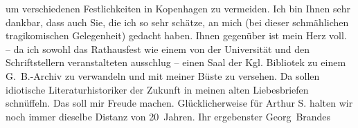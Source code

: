 \begin{ledgroupsized}[t]{13cm}
               um verschiedenen Festlichkeiten in Kopenhagen
               zu vermeiden. Ich bin Ihnen sehr dankbar, dass auch Sie, die ich so sehr schätze, an
               mich (bei dieser schmählichen tragikomischen Gelegenheit) gedacht haben.\pend
           \pstart
           Ihnen gegenüber ist mein Herz voll. \label{K_L02051-1v}\label{K_L02051-1h} – da ich sowohl das Rathausfest wie einem von
               der Universität und den Schriftstellern veranstalteten ausschlug – einen Saal der Kgl. Bibliotek zu einem G. B.-Archiv zu verwandeln und mit meiner Büste zu versehen.\pend
           \pstart
           Da sollen idiotische Literaturhistoriker der Zukunft in meinen alten Liebesbriefen
               schnüffeln. Das soll mir Freude machen.\pend
           \pstart
           Glücklicherweise für Arthur S. halten wir noch immer dieselbe Distanz von
               20 Jahren.\pend
           \pstart Ihr ergebenster \spacefill\mbox{Georg Brandes}\pend{}
         
         \endnumbering{}\end{ledgroupsized}  \newcommand{\dateiname}{L02051}\newcommand{\titel}{Georg Brandes an Arthur und Olga Schnitzler, 3. 2. 1912}\newcommand{\editorInnen}{Martin Anton Müller und Gerd-Hermann Susen}
      